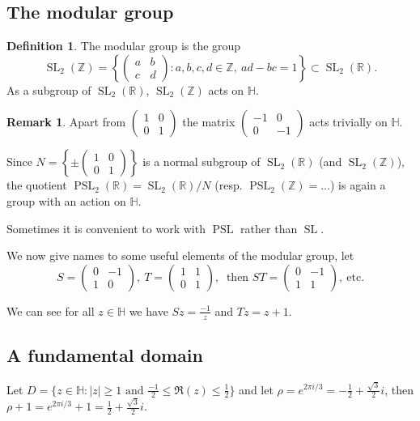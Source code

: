 \documentclass{article}
\theoremstyle{definition}
\newtheorem*{defn}{Definition}
\newtheorem*{rem}{Remark}
\DeclareMathOperator{\SL}{SL}
\DeclareMathOperator{\PSL}{PSL}
\begin{document}
\subsection{The modular group}

\begin{defn}
The modular group is the group 
\[\SL_2(\mathbb{Z}) =\left\{\begin{pmatrix} a & b\\c&d\end{pmatrix} \colon a,b,c,d\in\mathbb{Z},\ ad-bc = 1\right\}\subset \SL_2(\mathbb{R}).\]
As a subgroup of $\SL_2(\mathbb{R})$, $\SL_2(\mathbb{Z})$ acts on $\mathbb{H}$.
\end{defn}

\begin{rem}
Apart from $\begin{pmatrix}
1&0\\0&1
\end{pmatrix}$ the matrix $\begin{pmatrix}
-1&0\\0&-1
\end{pmatrix}$ acts trivially on $\mathbb{H}$.


Since $N=\left\{\pm\begin{pmatrix}
1&0\\0&1
\end{pmatrix} \right\}$ is a normal subgroup of $\SL_2(\mathbb{R})$ (and $\SL_2(\mathbb{Z})$), the quotient $\PSL_2(\mathbb{R})= \SL_2(\mathbb{R})/N$ (resp. $\PSL_2(\mathbb{Z})=\ldots$) is again a group with an action on $\mathbb{H}$.

Sometimes it is convenient to work with $\PSL$ rather than $\SL$.
\end{rem}

We now give names to some useful elements of the modular group, let
\[S=\begin{pmatrix}
0&-1\\1&0
\end{pmatrix},\ T= \begin{pmatrix}
1&1\\0&1
\end{pmatrix},\ \text{ then } ST = \begin{pmatrix}
0&-1\\1&1
\end{pmatrix},\ \text{etc.}\]

We can see for all $z\in\mathbb{H}$ we have $Sz = \frac{-1}{z}$ and $Tz = z+1$.

\subsection{A fundamental domain}
Let $D=\{z\in \mathbb{H}\colon |z|\ge 1\text{ and }\frac{-1}{2}\le \Re(z)\le \frac{1}{2}\}$ and let $\rho= e^{2\pi i/3} = -\frac{1}{2} + \frac{\sqrt{3}}{2}i$, then $\rho+1= e^{2\pi i/3} +1= \frac{1}{2} + \frac{\sqrt{3}}{2}i$.
\end{document}
